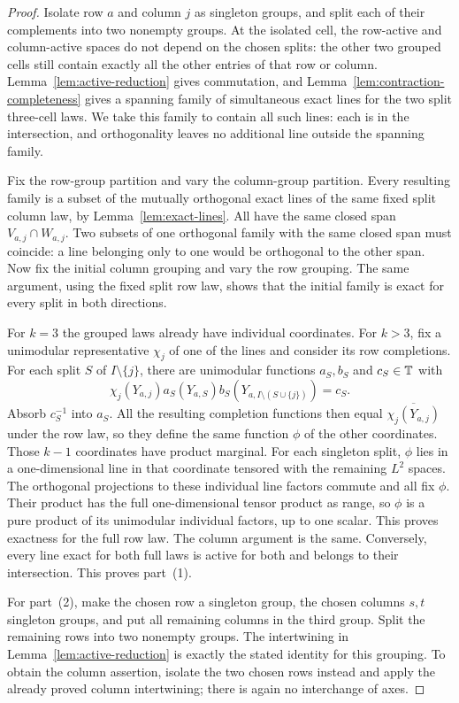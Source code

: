 \begin{proof}
Isolate row $a$ and column $j$ as singleton groups, and split each of
their complements into two nonempty groups.  At the isolated cell, the
row-active and column-active spaces do not depend on the chosen splits:
the other two grouped cells still contain exactly all the other entries
of that row or column.  Lemma~\ref{lem:active-reduction} gives commutation,
and Lemma~\ref{lem:contraction-completeness} gives a spanning family of
simultaneous exact lines for the two split three-cell laws. We take this
family to contain all such lines: each is in the intersection, and
orthogonality leaves no additional line outside the spanning family.

Fix the row-group partition and vary the column-group partition.  Every
resulting family is a subset of the mutually orthogonal exact lines of
the same fixed split column law, by Lemma~\ref{lem:exact-lines}.  All have
the same closed span $V_{a,j}\cap W_{a,j}$.  Two subsets of one orthogonal
family with the same closed span must coincide: a line belonging only to
one would be orthogonal to the other span.  Now fix the initial column
grouping and vary the row grouping.  The same argument, using the fixed
split row law, shows that the initial family is exact for every split
in both directions.

For $k=3$ the grouped laws already have individual coordinates.  For
$k>3$, fix a unimodular representative $\chi_j$ of one of the lines and
consider its row completions.  For each split $S$ of $I\setminus\{j\}$,
there are unimodular functions $a_S,b_S$ and $c_S\in\mathbb T$ with
\[
 \chi_j(Y_{a,j})a_S(Y_{a,S})b_S(Y_{a,I\setminus(S\cup\{j\})})=c_S.
\]
Absorb $c_S^{-1}$ into $a_S$.  All the resulting completion functions
then equal $\overline{\chi_j(Y_{a,j})}$ under the row law, so they define
the same function $\phi$ of the other coordinates.  Those $k-1$
coordinates have product marginal.  For each singleton split, $\phi$
lies in a one-dimensional line in that coordinate tensored with the
remaining $L^2$ spaces.  The orthogonal projections to these individual
line factors commute and all fix $\phi$.  Their product has the full
one-dimensional tensor product as range, so $\phi$ is a pure product
of its unimodular individual factors, up to one scalar.  This proves
exactness for the full row law.  The column argument is the same.
Conversely, every line exact for both full laws is active for both and
belongs to their intersection.  This proves part~(1).

For part~(2), make the chosen row a singleton group, the chosen columns
$s,t$ singleton groups, and put all remaining columns in the third
group.  Split the remaining rows into two nonempty groups.  The
intertwining in Lemma~\ref{lem:active-reduction} is exactly the stated
identity for this grouping.  To obtain the column assertion, isolate
the two chosen rows instead and apply the already proved column
intertwining; there is again no interchange of axes.


\end{proof}
